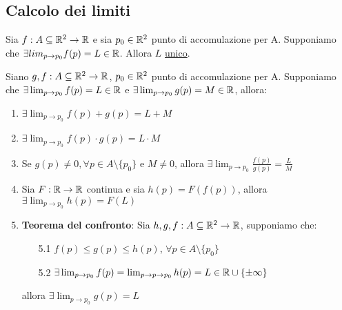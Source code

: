 \subsection{Calcolo dei limiti}
\begin{proposition}
  Sia $f: A \subseteq \mathbb{R}^2 \to \mathbb{R}$ e sia $p_0 \in \mathbb{R}^2$ punto di accomulazione per A. Supponiamo che 
  $\exists lim_{p \to p_0} f(p) = L \in \mathbb{R}$. Allora $L$ \ace \underline{unico}.
\end{proposition}
\begin{theorem}
  Siano $g,f: A \subseteq \mathbb{R}^2 \to \mathbb{R}$, $p_0 \in \mathbb{R}^2$ punto di accomulazione per A. Supponiamo che 
  $\exists \lim_{p\to p_0} f(p) = L \in \mathbb{R}$ e $\exists \lim_{p\to p_0} g(p) = M \in \mathbb{R}$, allora:
  \begin{enumerate}
    \item $\exists \lim_{p\to p_0} f(p) + g(p)= L + M$
    \item $\exists \lim_{p\to p_0} f(p) \cdot g(p)= L \cdot M$
    \item Se $g(p) \not = 0, \forall p \in A\setminus \{p_0\}$ e $M \not = 0$, allora $\exists \lim_{p\to p_0} \frac{f(p)}{g(p)} = \frac{L}{M}$
    \item Sia $F:\mathbb{R} \to \mathbb{R}$ continua e sia $h(p) = F(f(p))$, allora $\exists  \lim_{p\to p_0} h(p) = F(L)$
    \item \textbf{Teorema del confronto}: Sia $h,g,f: A \subseteq \mathbb{R}^2 \to \mathbb{R}$, supponiamo che:
          \begin{itemize}
            \item[5.1] $f(p) \leq g(p) \leq h(p)$, $\forall p \in A \setminus \{p_0\}$
            \item[5.2] $\exists\lim_{p \to p_0} f(p) = \lim_{p \to p\to p_0} h(p) = L \in \mathbb{R} \cup \{\pm \infty\}$
          \end{itemize}
          allora $\exists \lim_{p \to p_0} g(p) = L$
  \end{enumerate}
\end{theorem}
